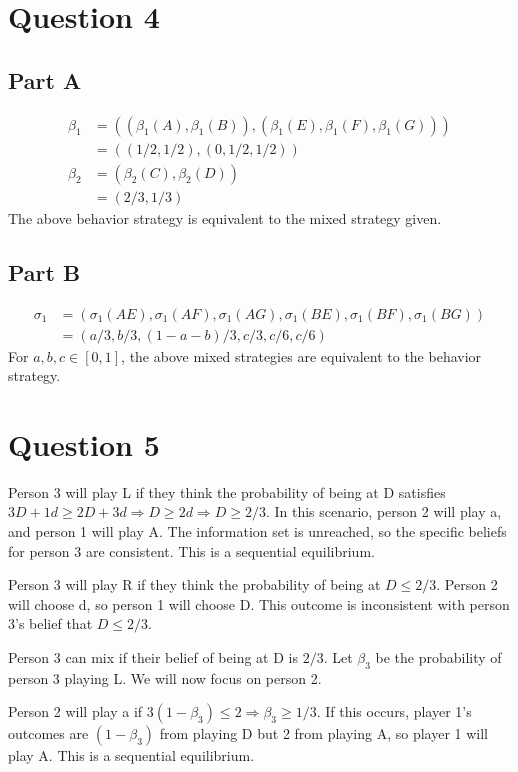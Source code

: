 \documentclass[11pt]{article} %
\begin{document}
\section{Question 4}
\subsection{Part A}
\begin{align*}
\beta_1 &= \left((\beta_1(A),\beta_1(B)),(\beta_1(E),\beta_1(F),\beta_1(G))\right)\\
&= ((1/2,1/2),(0,1/2,1/2))\\
\beta_2 &= (\beta_2(C),\beta_2(D))\\
&= (2/3,1/3)
\end{align*}
The above behavior strategy is equivalent to the mixed strategy given.
\subsection{Part B}
\begin{align*}
\sigma_1 &= \left(\sigma_1(AE),\sigma_1(AF),\sigma_1(AG),\sigma_1(BE),\sigma_1(BF),\sigma_1(BG) \right) \\
&= (a/3,b/3,(1-a-b)/3,c/3,c/6,c/6)
\end{align*}
For $a,b,c \in [0,1]$, the above mixed strategies are equivalent to the behavior strategy.
\section{Question 5}

Person 3 will play L if they think the probability of being at D satisfies $3D + 1d \geq 2D + 3d \Rightarrow D\geq 2d \Rightarrow D \geq 2/3$. In this scenario, person 2 will play a, and person 1 will play A. The information set is unreached, so the specific beliefs for person 3 are consistent. This is a sequential equilibrium.

Person 3 will play R if they think the probability of being at $D\leq 2/3$. Person 2 will choose d, so person 1 will choose D. This outcome is inconsistent with person 3's belief that $D\leq 2/3$.

Person 3 can mix if their belief of being at D is $2/3$. Let $\beta_3$ be the probability of person 3 playing L. We will now focus on person 2.

Person 2 will play a if $3(1-\beta_3)\leq 2 \Rightarrow \beta_3\geq 1/3.$ If this occurs, player 1's outcomes are $(1-\beta_3)$ from playing D but 2 from playing A, so player 1 will play A. This is a sequential equilibrium.
\end{document}
